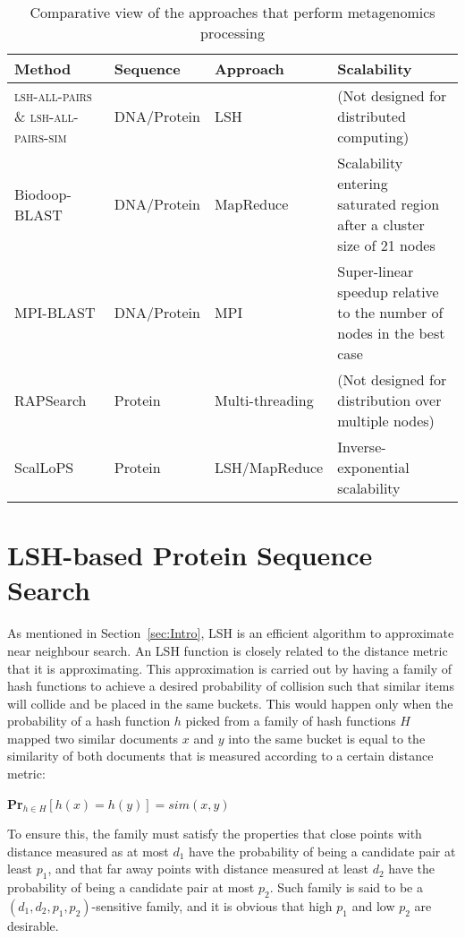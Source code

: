 \documentclass[titlepage]{csetr}
\begin{document}
\begin{table} [!ht]
\centering
\caption{Comparative view of the approaches that perform metagenomics processing
\label{tbl:RelatedWorks}}
\begin{tabular} { |p{}| p{}|p{}|p{}|}
\hline
Method & Sequence & Approach & Scalability\\
\hline
 \textsc{lsh-all-pairs} \cite{SequenceComparisonLSH} \& \textsc{lsh-all-pairs-sim} \cite{LSH-ALL-PAIRS-SIM, LSH-ALL-PAIRS-SIM2} & DNA/Protein & LSH & (Not designed for distributed computing)\\
\hline
Biodoop-BLAST \cite{Biodoop} & DNA/Protein & MapReduce & Scalability entering saturated region after a cluster size of 21 nodes\\
\hline
MPI-BLAST \cite{MPIBLAST} & DNA/Protein & MPI & Super-linear speedup relative to the number of nodes in the best case \\
\hline
RAPSearch \cite{RAPSearch} \cite{RAPSearch2} & Protein & Multi-threading & (Not designed for distribution over multiple nodes)\\
\hline
ScalLoPS & Protein & LSH/Map\-Reduce & Inverse-exponential scalability\\
\hline
\end{tabular}
\end{table}

\section{LSH-based Protein Sequence Search}
\label{sec:LSH}

As mentioned in Section~\ref{sec:Intro}, LSH is an efficient algorithm to approximate near neighbour search. An LSH function is closely related to the distance metric that it is approximating.  This approximation is carried out by having a family of hash functions to achieve a desired probability of collision such that similar items will collide and be placed in the same buckets. This would happen only when the probability of a hash function $h$ picked from a family of hash functions $H$ mapped two similar documents $x$ and $y$ into the same bucket is equal to the similarity of both documents that is measured according to a certain distance metric:

\textbf{Pr}$_{h \in H}[h(x)=h(y)]=sim(x,y) $

To ensure this, the family must satisfy the properties that close points with distance measured as at most $d_{1}$ have the probability of being a candidate pair at least $ p_{1}$, and that far away points with distance measured at least $d_{2}$ have the probability of being a candidate pair at most $ p_{2}$. Such family is said to be a $ (d_{1},d_{2},p_{1},p_{2})$-sensitive family, and it is obvious that high $p_{1}$ and low $p_{2}$ are desirable.
\end{document}
